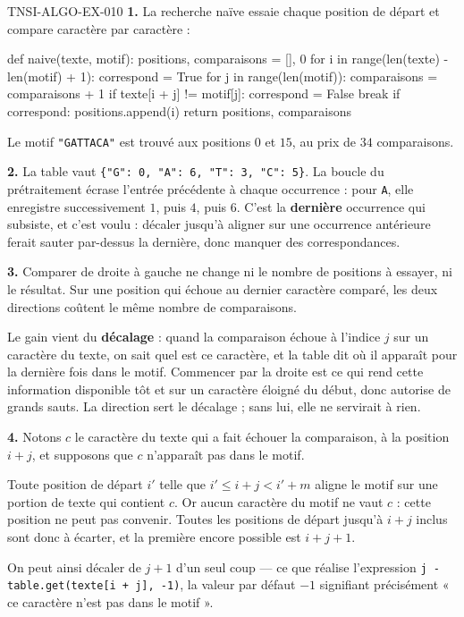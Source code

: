 \begin{corrige}{TNSI-ALGO-EX-010}
\textbf{1.} La recherche naïve essaie chaque position de départ et compare
caractère par caractère :
\begin{python}
def naive(texte, motif):
    positions, comparaisons = [], 0
    for i in range(len(texte) - len(motif) + 1):
        correspond = True
        for j in range(len(motif)):
            comparaisons = comparaisons + 1
            if texte[i + j] != motif[j]:
                correspond = False
                break
        if correspond:
            positions.append(i)
    return positions, comparaisons
\end{python}
Le motif \lstinline{"GATTACA"} est trouvé aux positions $0$ et $15$, au prix de
$34$ comparaisons.

\textbf{2.} La table vaut
\lstinline!{"G": 0, "A": 6, "T": 3, "C": 5}!. La boucle du prétraitement écrase
l'entrée précédente à chaque occurrence : pour \lstinline{A}, elle enregistre
successivement $1$, puis $4$, puis $6$. C'est la \textbf{dernière} occurrence qui
subsiste, et c'est voulu : décaler jusqu'à aligner sur une occurrence antérieure
ferait sauter par-dessus la dernière, donc manquer des correspondances.

\textbf{3.} Comparer de droite à gauche ne change ni le nombre de positions à
essayer, ni le résultat. Sur une position qui échoue au dernier caractère
comparé, les deux directions coûtent le même nombre de comparaisons.

Le gain vient du \textbf{décalage} : quand la comparaison échoue à l'indice $j$
sur un caractère du texte, on sait quel est ce caractère, et la table dit où il
apparaît pour la dernière fois dans le motif. Commencer par la droite est ce qui
rend cette information disponible tôt et sur un caractère éloigné du début, donc
autorise de grands sauts. La direction sert le décalage ; sans lui, elle ne
servirait à rien.

\textbf{4.} Notons $c$ le caractère du texte qui a fait échouer la comparaison, à
la position $i+j$, et supposons que $c$ n'apparaît pas dans le motif.

Toute position de départ $i'$ telle que $i'\leqslant i+j < i'+m$ aligne le motif
sur une portion de texte qui contient $c$. Or aucun caractère du motif ne vaut
$c$ : cette position ne peut pas convenir. Toutes les positions de départ jusqu'à
$i+j$ inclus sont donc à écarter, et la première encore possible est $i+j+1$.

On peut ainsi décaler de $j+1$ d'un seul coup — ce que réalise l'expression
\lstinline{j - table.get(texte[i + j], -1)}, la valeur par défaut $-1$ signifiant
précisément « ce caractère n'est pas dans le motif ».


\end{corrige}
